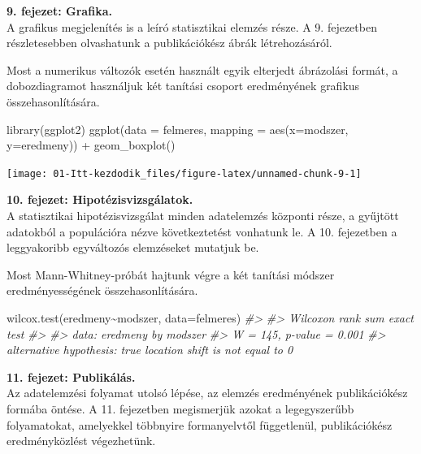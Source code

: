 \documentclass[
]{book}
\newenvironment{Shaded}{\begin{snugshade}}{\end{snugshade}}
\newcommand{\AttributeTok}[1]{\textcolor[rgb]{0.77,0.63,0.00}{#1}}
\newcommand{\CommentTok}[1]{\textcolor[rgb]{0.56,0.35,0.01}{\textit{#1}}}
\newcommand{\FunctionTok}[1]{\textcolor[rgb]{0.00,0.00,0.00}{#1}}
\newcommand{\NormalTok}[1]{#1}
\newcommand{\SpecialCharTok}[1]{\textcolor[rgb]{0.00,0.00,0.00}{#1}}
\begin{document}
\textbf{9. fejezet: Grafika.}\\
A grafikus megjelenítés is a leíró statisztikai elemzés része. A 9. fejezetben részletesebben olvashatunk a publikációkész ábrák létrehozásáról.

Most a numerikus változók esetén használt egyik elterjedt ábrázolási formát, a dobozdiagramot használjuk két tanítási csoport eredményének grafikus összehasonlítására.

\begin{Shaded}
\begin{Highlighting}[]
\FunctionTok{library}\NormalTok{(ggplot2)}
\FunctionTok{ggplot}\NormalTok{(}\AttributeTok{data =}\NormalTok{ felmeres, }\AttributeTok{mapping =} \FunctionTok{aes}\NormalTok{(}\AttributeTok{x=}\NormalTok{modszer, }\AttributeTok{y=}\NormalTok{eredmeny)) }\SpecialCharTok{+} \FunctionTok{geom\_boxplot}\NormalTok{()}
\end{Highlighting}
\end{Shaded}

\begin{center}\texttt{[image: 01-Itt-kezdodik\_files/figure-latex/unnamed-chunk-9-1]} \end{center}

\textbf{10. fejezet: Hipotézisvizsgálatok.}\\
A statisztikai hipotézisvizsgálat minden adatelemzés központi része, a gyűjtött adatokból a populációra nézve következtetést vonhatunk le. A 10. fejezetben a leggyakoribb egyváltozós elemzéseket mutatjuk be.

Most Mann-Whitney-próbát hajtunk végre a két tanítási módszer eredményességének összehasonlítására.

\begin{Shaded}
\begin{Highlighting}[]
\FunctionTok{wilcox.test}\NormalTok{(eredmeny}\SpecialCharTok{\textasciitilde{}}\NormalTok{modszer, }\AttributeTok{data=}\NormalTok{felmeres)}
\CommentTok{\#\textgreater{} }
\CommentTok{\#\textgreater{}  Wilcoxon rank sum exact test}
\CommentTok{\#\textgreater{} }
\CommentTok{\#\textgreater{} data:  eredmeny by modszer}
\CommentTok{\#\textgreater{} W = 145, p{-}value = 0.001}
\CommentTok{\#\textgreater{} alternative hypothesis: true location shift is not equal to 0}
\end{Highlighting}
\end{Shaded}

\textbf{11. fejezet: Publikálás.}\\
Az adatelemzési folyamat utolsó lépése, az elemzés eredményének publikációkész formába öntése. A 11. fejezetben megismerjük azokat a legegyszerűbb folyamatokat, amelyekkel többnyire formanyelvtől függetlenül, publikációkész eredményközlést végezhetünk.
\end{document}
